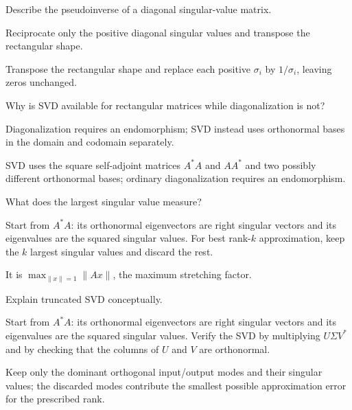 \begin{exercise}\label{exr:i18-05}
Describe the pseudoinverse of a diagonal singular-value matrix.
\end{exercise}
\begin{hint}
Reciprocate only the positive diagonal singular values and transpose the rectangular shape.
\end{hint}
\begin{solution}
Transpose the rectangular shape and replace each positive $\sigma_i$ by $1/\sigma_i$, leaving zeros unchanged.
\end{solution}

\begin{exercise}\label{exr:i18-06}
Why is SVD available for rectangular matrices while diagonalization is not?
\end{exercise}
\begin{hint}
Diagonalization requires an endomorphism; SVD instead uses orthonormal bases in the domain and codomain separately.
\end{hint}
\begin{solution}
SVD uses the square self-adjoint matrices $A^*A$ and $AA^*$ and two possibly different orthonormal bases; ordinary diagonalization requires an endomorphism.
\end{solution}

\begin{exercise}\label{exr:i18-07}
What does the largest singular value measure?
\end{exercise}
\begin{hint}
Start from \(A^*A\): its orthonormal eigenvectors are right singular vectors and its eigenvalues are the squared singular values. For best rank-\(k\) approximation, keep the \(k\) largest singular values and discard the rest.
\end{hint}
\begin{solution}
It is $\max_{\|x\|=1}\|Ax\|$, the maximum stretching factor.
\end{solution}

\begin{exercise}\label{exr:i18-08}
Explain truncated SVD conceptually.
\end{exercise}
\begin{hint}
Start from \(A^*A\): its orthonormal eigenvectors are right singular vectors and its eigenvalues are the squared singular values. Verify the SVD by multiplying \(U\Sigma V^*\) and by checking that the columns of \(U\) and \(V\) are orthonormal.
\end{hint}
\begin{solution}
Keep only the dominant orthogonal input/output modes and their singular values; the discarded modes contribute the smallest possible approximation error for the prescribed rank.
\end{solution}


